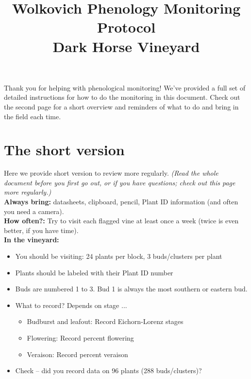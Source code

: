 \documentclass[11pt,letter]{article}
\newenvironment{smitemize}{
\begin{itemize}
  \setlength{\itemsep}{0pt}
  \setlength{\parskip}{0.8pt}
  \setlength{\parsep}{0pt}}
{\end{itemize}
}
\begin{document}

\renewcommand{\refname}{\CHead{}}

\title{Wolkovich Phenology Monitoring Protocol\\
Dark Horse Vineyard}
\date{ }
\maketitle

Thank you for helping with phenological monitoring! We've provided a full set of detailed instructions for how to do the monitoring in this document. Check out the second page for a short overview and reminders of what to do and bring in the field each time. 
\vspace{2ex}
\tableofcontents

\newpage
\section{The short version} %
Here we provide short version to review more regularly. \emph{(Read the whole document before you first go out, or if you have questions; check out this page more regularly.)}\\

{\bf Always bring:} datasheets, clipboard, pencil, Plant ID information (and often you need a camera).\\

{\bf How often?:} Try to visit each flagged vine at least once a week (twice is even better, if you have time).\\

{\bf In the vineyard:} 
\begin{smitemize}
\item You should be visiting: 24 plants per block, 3 buds/clusters per plant
\item Plants should be labeled with their Plant ID number
\item Buds are numbered 1 to 3. Bud 1 is always the most southern or eastern bud.
\item What to record? Depends on stage ... 
\begin{smitemize}
\item Budburst and leafout: Record Eichorn-Lorenz stages
\item Flowering: Record percent flowering
\item Veraison: Record percent veraison
\end{smitemize}
\item Check -- did you record data on 96 plants (288 buds/clusters)?
\end{smitemize}
\end{document}
